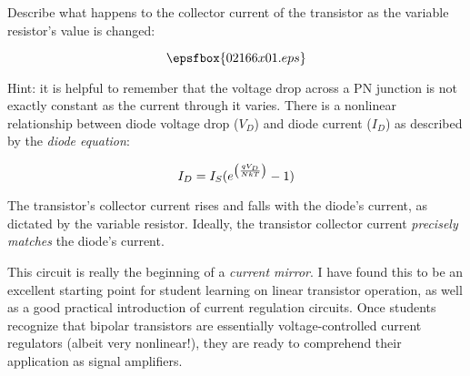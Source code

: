 

Describe what happens to the collector current of the transistor as the variable resistor's value is changed:

$$\epsfbox{02166x01.eps}$$

Hint: it is helpful to remember that the voltage drop across a PN junction is not exactly constant as the current through it varies.  There is a nonlinear relationship between diode voltage drop ($V_D$) and diode current ($I_D$) as described by the {\it diode equation}:

$$I_D = I_S (e^{\left({qV_D \over NkT}\right)} - 1)$$







The transistor's collector current rises and falls with the diode's current, as dictated by the variable resistor.  Ideally, the transistor collector current {\it precisely matches} the diode's current.







This circuit is really the beginning of a {\it current mirror}.  I have found this to be an excellent starting point for student learning on linear transistor operation, as well as a good practical introduction of current regulation circuits.  Once students recognize that bipolar transistors are essentially voltage-controlled current regulators (albeit very nonlinear!), they are ready to comprehend their application as signal amplifiers.




